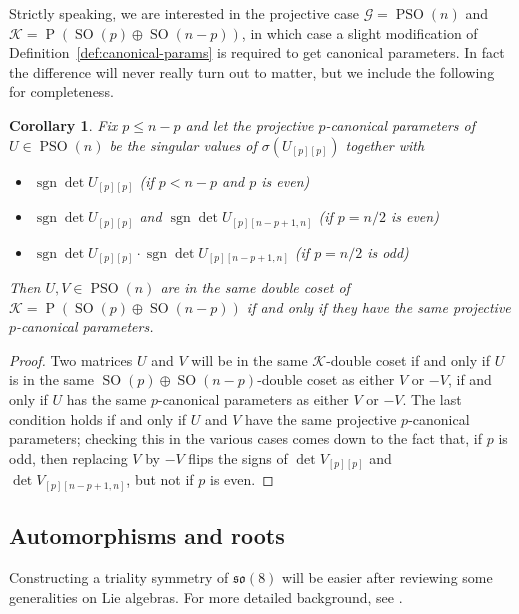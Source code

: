 \documentclass[reqno]{amsart}
\newtheorem{corollary}[theorem]{Corollary}
\theoremstyle{definition} \newtheorem{example}[theorem]{Example}
\newcommand{\SO}{\operatorname{SO}}
\newcommand{\PSO}{\operatorname{PSO}}
\newcommand{\so}{\mathfrak{so}}
\newcommand{\sgn}{\operatorname{sgn}}
\renewcommand{\P}{\operatorname{P}}
\newcommand{\G}{\mathcal{G}}
\newcommand{\K}{\mathcal{K}}
\begin{document}
Strictly speaking, we are interested in the projective case $\G = \PSO(n)$ and $\K = \P(\SO(p) \oplus \SO(n-p))$, in which case a slight modification of Definition~\ref{def:canonical-params} is required to get canonical parameters. In fact the difference will never really turn out to matter, but we include the following for completeness.
\begin{corollary}
Fix $p \leq n-p$ and let the \emph{projective $p$-canonical parameters} of $U \in \PSO(n)$ be the singular values of $\sigma(U_{[p][p]})$ together with
\begin{itemize}
\item $\sgn \det U_{[p][p]}$ (if $p < n-p$ and $p$ is even)
\item $\sgn \det U_{[p][p]}$ and $\sgn \det U_{[p][n-p+1,n]}$  (if $p = n/2$ is even)
\item $\sgn \det U_{[p][p]} \cdot \sgn \det U_{[p][n-p+1,n]}$  (if $p = n/2$ is odd)
\end{itemize}
Then $U,V \in \PSO(n)$ are in the same double coset of $\K = \P(\SO(p) \oplus \SO(n-p))$ if and only if they have the same projective $p$-canonical parameters.
\end{corollary}

\begin{proof}
Two matrices $U$ and $V$ will be in the same $\K$-double coset if and only if $U$ is in the same $\SO(p) \oplus \SO(n-p)$-double coset as either $V$ or $-V$, if and only if $U$ has the same $p$-canonical parameters as either $V$ or $-V$. The last condition holds if and only if $U$ and $V$ have the same projective $p$-canonical parameters; checking this in the various cases comes down to the fact that, if $p$ is odd, then replacing $V$ by $-V$ flips the signs of $\det V_{[p][p]}$ and $\det V_{[p][n-p+1,n]}$, but not if $p$ is even.
\end{proof}



\subsection{Automorphisms and roots}
Constructing a triality symmetry of $\so(8)$ will be easier after reviewing some generalities on Lie algebras. For more detailed background, see \cite[Ch.\ III and IV]{humphreys}.
\end{document}
